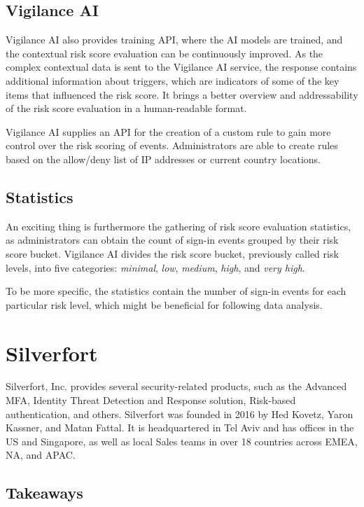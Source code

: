 \subsection*{Vigilance AI}

Vigilance AI also provides training API, where the AI models are trained, and the contextual risk score evaluation can be continuously improved.
As the complex contextual data is sent to the Vigilance AI service, the response contains additional information about triggers, which are indicators of some of the key items that influenced the risk score.
It brings a better overview and addressability of the risk score evaluation in a human-readable format.

Vigilance AI supplies an API for the creation of a custom rule to gain more control over the risk scoring of events.
Administrators are able to create rules based on the allow/deny list of IP addresses or current country locations. \cite{existing-onelogin-vigilance}

\newpage
\subsection*{Statistics}

An exciting thing is furthermore the gathering of risk score evaluation statistics, as administrators can obtain the count of sign-in events grouped by their risk score bucket.
Vigilance AI divides the risk score bucket, previously called risk levels, into five categories: \textit{minimal}, \textit{low}, \textit{medium}, \textit{high}, and \textit{very high}.

To be more specific, the statistics contain the number of sign-in events for each particular risk level, which might be beneficial for following data analysis. \cite{existing-onelogin-score-insights} \cite{existing-onelogin-score}

\section{Silverfort}
Silverfort, Inc. provides several security-related products, such as the Advanced MFA, Identity Threat Detection and Response solution, Risk-based authentication, and others.
Silverfort was founded in 2016 by Hed Kovetz, Yaron Kassner, and Matan Fattal.
It is headquartered in Tel Aviv and has offices in the US and Singapore, as well as local Sales teams in over 18 countries across EMEA, NA, and APAC.\cite{example_silverfort}

\subsection*{Takeaways}

